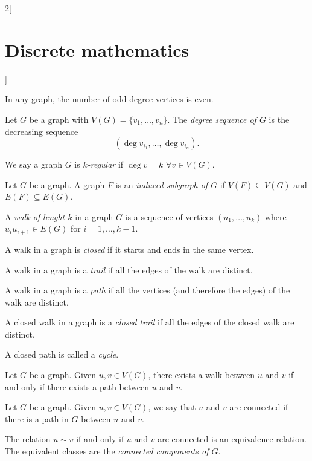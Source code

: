 \documentclass[../../../main.tex]{subfiles}
\begin{document}
\begin{multicols}{2}[\section{Discrete mathematics}]
\begin{corollary}
In any graph, the number of odd-degree vertices is even.
\end{corollary}
\begin{definition}
Let $G$ be a graph with $V(G)=\{v_1,\ldots,v_n\}$. The \textit{degree sequence of $G$} is the decreasing sequence $$(\deg v_{i_1},\ldots,\deg v_{i_n}).$$
\end{definition}
\begin{definition}
We say a graph $G$ is \textit{$k$-regular} if $\deg v=k$ $\forall v\in V(G)$.
\end{definition}
\begin{definition}
Let $G$ be a graph. A graph $F$ is an \textit{induced subgraph of $G$} if $V(F)\subseteq V(G)$ and $E(F)\subseteq E(G)$.
\end{definition}
\begin{definition}
A \textit{walk of lenght $k$} in a graph $G$ is a sequence of vertices $(u_1,\ldots,u_k)$ where $u_iu_{i+1}\in E(G)$ for $i=1,\ldots,k-1$.
\end{definition}
\begin{definition}
A walk in a graph is \textit{closed} if it starts and ends in the same vertex.
\end{definition}
\begin{definition}
A walk in a graph is a \textit{trail} if all the edges of the walk are distinct.
\end{definition}
\begin{definition}
A walk in a graph is a \textit{path} if all the vertices (and therefore the edges) of the walk are distinct.
\end{definition}
\begin{definition}
A closed walk in a graph is a \textit{closed trail} if all the edges of the closed walk are distinct.
\end{definition}
\begin{definition}
A closed path is called a \textit{cycle}.
\end{definition}
\begin{prop}
Let $G$ be a graph. Given $u,v\in V(G)$, there exists a walk between $u$ and $v$ if and only if there exists a path between $u$ and $v$.
\end{prop}
\begin{definition}
Let $G$ be a graph. Given $u,v\in V(G)$, we say that $u$ and $v$ are connected if there is a path in $G$ between $u$ and $v$.
\end{definition}
\begin{prop}
The relation $u\sim v$ if and only if $u$ and $v$ are connected is an equivalence relation. The equivalent classes are the \textit{connected components of $G$}.

\end{prop}
\end{multicols}
\end{document}
